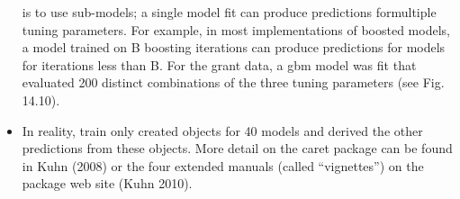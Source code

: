 \begin{itemize}
is to use sub-models; a single model fit can produce predictions formultiple tuning parameters. For example, in most implementations of boosted
models, a model trained on B boosting iterations can produce predictions for
models for iterations less than B. For the grant data, a gbm model was fit
that evaluated 200 distinct combinations of the three tuning parameters (see
Fig. 14.10). 
\item In reality, train only created objects for 40 models and derived
the other predictions from these objects.
More detail on the caret package can be found in Kuhn (2008) or the four
extended manuals (called “vignettes”) on the package web site (Kuhn 2010).
\end{itemize}

